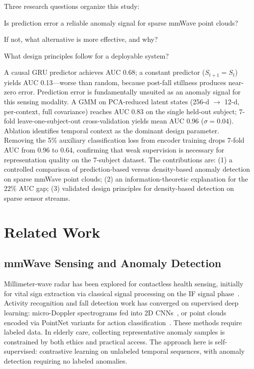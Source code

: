 \documentclass[11pt,a4paper]{article}
\begin{document}
Three research questions organize this study:

\begin{description}[leftmargin=2em,style=nextline]
    \item[\textbf{RQ1:}] Is prediction error a reliable anomaly signal for sparse mmWave point clouds?
    \item[\textbf{RQ2:}] If not, what alternative is more effective, and why?
    \item[\textbf{RQ3:}] What design principles follow for a deployable system?
\end{description}

A causal GRU predictor achieves AUC 0.68; a constant predictor ($S_{t+1}{=}S_t$) yields AUC 0.13---worse than random, because post-fall stillness produces near-zero error.
Prediction error is fundamentally unsuited as an anomaly signal for this sensing modality.
A GMM on PCA-reduced latent states (256-d $\to$ 12-d, per-context, full covariance) reaches AUC 0.83 on the single held-out subject; 7-fold leave-one-subject-out cross-validation yields mean AUC 0.96 ($\sigma = 0.04$).
Ablation identifies temporal context as the dominant design parameter.
Removing the 5\% auxiliary classification loss from encoder training drops 7-fold AUC from 0.96 to 0.64, confirming that weak supervision is necessary for representation quality on the 7-subject dataset.
The contributions are: (1) a controlled comparison of prediction-based versus density-based anomaly detection on sparse mmWave point clouds; (2) an information-theoretic explanation for the 22\% AUC gap; (3) validated design principles for density-based detection on sparse sensor streams.

\section{Related Work}

\subsection{mmWave Sensing and Anomaly Detection}

Millimeter-wave radar has been explored for contactless health sensing, initially for vital sign extraction via classical signal processing on the IF signal phase~\cite{li2017radar,zhao2018through}.
Activity recognition and fall detection work has converged on supervised deep learning: micro-Doppler spectrograms fed into 2D CNNs~\cite{jiang2022mmfall,zhang2023mmwave}, or point clouds encoded via PointNet variants for action classification~\cite{sengupta2023mmp}.
These methods require labeled data.
In elderly care, collecting representative anomaly samples is constrained by both ethics and practical access.
The approach here is self-supervised: contrastive learning on unlabeled temporal sequences, with anomaly detection requiring no labeled anomalies.
\end{document}
